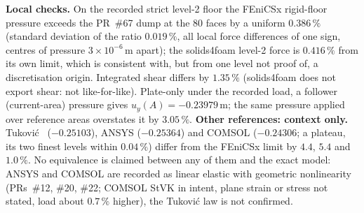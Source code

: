 \documentclass[sn-mathphys,Numbered]{sn-jnl}
\begin{document}
\textbf{Local checks.} On the recorded strict level-2 floor the FEniCSx rigid-floor pressure exceeds the PR~\#67 dump at the 80 faces by a uniform $0.386\,\%$ (standard deviation of the ratio $0.019\,\%$, all local force differences of one sign, centres of pressure $3\times10^{-6}\,\mathrm m$ apart); the solids4foam level-2 force is $0.416\,\%$ from its own limit, which is consistent with, but from one level not proof of, a discretisation origin. Integrated shear differs by $1.35\,\%$ (solids4foam does not export shear: not like-for-like). Plate-only under the recorded load, a follower (current-area) pressure gives $u_y(A)=-0.23979\,\mathrm m$; the same pressure applied over reference areas overstates it by $3.05\,\%$.
\textbf{Other references: context only.} Tukovi\'c~\citep{Tukovic2018} ($-0.25103$), ANSYS ($-0.25364$) and COMSOL ($-0.24306$; a plateau, its two finest levels within $0.04\,\%$) differ from the FEniCSx limit by $4.4$, $5.4$ and $1.0\,\%$. No equivalence is claimed between any of them and the exact model: ANSYS and COMSOL are recorded as linear elastic with geometric nonlinearity (PRs~\#12, \#20, \#22; COMSOL StVK in intent, plane strain or stress not stated, load about $0.7\,\%$ higher), the Tukovi\'c law is not confirmed.
\end{document}
